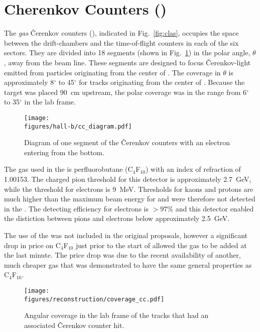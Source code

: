 \section{Cherenkov Counters ()}\label{sec:clas.cc}

The \emph{gas} \v{C}erenkov counters (), indicated in Fig.~\ref{fig:clas}, occupies the space between the drift-chambers and the time-of-flight counters in each of the six sectors. They are divided into 18 segments (shown in Fig.~\ref{fig:clas.cc}) in the polar angle, $\theta$, away from the beam line. These segments are designed to focus \v{C}erenkov-light emitted from particles originating from the center of . The coverage in $\theta$ is approximately 8$^\circ$ to 45$^\circ$ for tracks originating from the center of . Because the target was placed 90~cm upstream, the polar coverage was in the range from 6$^\circ$ to 35$^\circ$ in the lab frame.

\begin{figure}\begin{center}
\texttt{[image: \\figures/hall-b/cc\_diagram.pdf]}
\caption[\v{C}erenkov Detector Segment Diagram]{\label{fig:clas.cc}Diagram of one segment of the \v{C}erenkov counters with an electron entering from the bottom.}
\end{center}\end{figure}

The gas used in the  is perfluorobutane (C$_4$F$_{10}$) with an index of refraction of 1.00153. The charged pion threshold for this detector is approximately 2.7~GeV, while the threshold for electrons is 9~MeV. Thresholds for kaons and protons are much higher than the maximum beam energy for  and were therefore not detected in the . The detecting efficiency for electrons is $> 97\%$ and this detector enabled the distiction between pions and electrons below approximately 2.5~GeV.

The use of the  was not included in the original proposals, however a significant drop in price on C$_4$F$_{10}$ just prior to the start of  allowed the gas to be added at the last minute. The price drop was due to the recent availability of another, much cheaper gas that was demonstrated to have the same general properties as C$_4$F$_{10}$.

\begin{figure}\begin{center}
\texttt{[image: \\figures/reconstruction/coverage\_cc.pdf]}
\caption[\v{C}erenkov Counter Angular Coverage]{\label{fig:clas.cc.coverage}{}Angular coverage in the lab frame of the tracks that had an associated \v{C}erenkov counter hit.}
\end{center}\end{figure}
